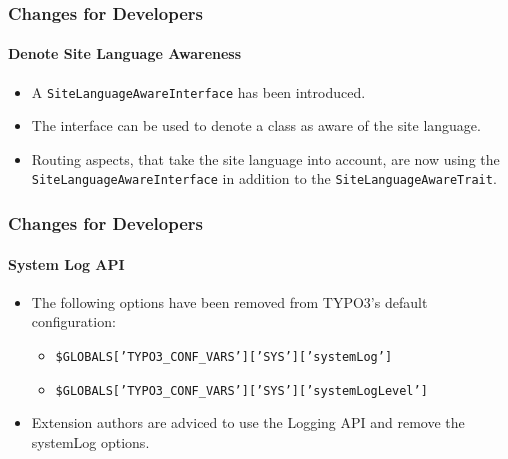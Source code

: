 \begin{frame}[fragile]
	\frametitle{Changes for Developers}
	\framesubtitle{Denote Site Language Awareness}

	\lstset{basicstyle=\tiny\ttfamily}


	\begin{itemize}
		\item A \texttt{SiteLanguageAwareInterface} has been introduced.
		\item The interface can be used to denote a class as aware of the site language.
		\item Routing aspects, that take the site language into account,
			are now using the \texttt{SiteLanguageAwareInterface}
			in addition to the \texttt{SiteLanguageAwareTrait}.
	\end{itemize}

\end{frame}


\begin{frame}[fragile]
	\frametitle{Changes for Developers}
	\framesubtitle{System Log API}

	\lstset{basicstyle=\tiny\ttfamily}

	\begin{itemize}
		\item The following options have been removed from TYPO3's default configuration:

			\begin{itemize}\smaller
				\item \texttt{\$GLOBALS['TYPO3\_CONF\_VARS']['SYS']['systemLog']}
				\item \texttt{\$GLOBALS['TYPO3\_CONF\_VARS']['SYS']['systemLogLevel']}
			\end{itemize}\normalsize

		\item Extension authors are adviced to use the Logging API and remove the systemLog options.
	\end{itemize}

\end{frame}

